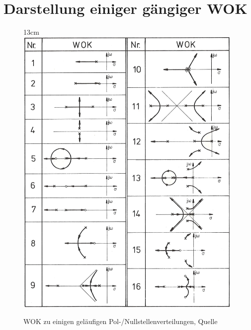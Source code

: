 \section{Darstellung einiger gängiger WOK}
	\begin{figure}[h!]{13cm}
		\includegraphics[width=11cm]{./images/BilderWOK.png}
		\caption{WOK zu einigen geläufigen Pol-/Nullstellenverteilungen, Quelle}
	\end{figure}